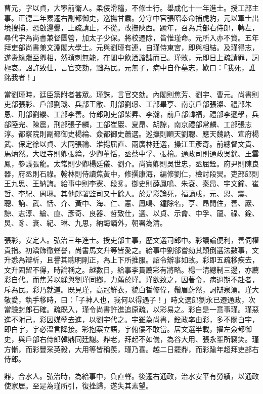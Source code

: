 \begin{pinyinscope}
曹元，字以貞，大寧前衛人。柔佞滑稽，不修士行。舉成化十一年進士。授工部主事。正德二年累遷右副都御史，巡撫甘肅。分守中官張昭奉命捕虎豹，元以軍士出境搜捕，恐啟邊釁，上疏請止，不從。改撫陜西。踰年，召為兵部右侍郎，轉左，尋代宇為尚書兼督團營，加太子少保。將校遷除，皆惟瑾命。元所入亦不貲。五年拜吏部尚書兼文淵閣大學士。元與劉瑾有連，自瑾侍東宮，即與相結。及瑾得志，遂夤緣躐至卿相，然瑣刺無能，在閣中飲酒諧謔而已。瑾敗，元即日上疏請罪，詞極哀。詔許致仕，言官交劾，黜為民。元無子，病中自作墓志，歎曰：「我死，誰銘我者！」

當劉瑾時，廷臣黨附者甚眾。瑾誅，言官交劾。內閣則焦芳、劉宇、曹元。尚書則吏部張彩、戶部劉璣、兵部王敞、刑部劉璟、工部畢亨、南京戶部張澯、禮部朱恩、刑部劉纓、工部李善。侍郎則吏部柴昇、李瀚，前戶部韓福，禮部李遜學，兵部陸完、陳震，刑部張子麟，工部崔巖、夏昂、胡諒，南京禮部常麟、工部張志淳。都察院則副都御史楊綸、僉都御史蕭選。巡撫則順天劉聰、應天魏訥、宣府楊武、保定徐以貞、大同張禴、淮揚屈直、兩廣林廷選，操江王彥奇。前總督文貴、馬炳然。大理寺則卿張綸，少卿董恬，丞蔡中孚、張檜。通政司則通政吳釴、王雲鳳，參議張龍。太常則少卿楊廷儀、劉介。尚寶卿則吳世忠，丞屈銓。府尹則陳良器，府丞則石祿。翰林則侍讀焦黃中，修撰康海，編修劉仁，檢討段炅。吏部郎則王九思、王納誨。給事中則李憲、段豸。御史則薛鳳鳴、朱袞、秦昂、宇文鐘、崔哲、李紀、周琳。其他郎署監司又十餘人。於是彩論死，福謫戍，元、恩、震、聰、訥、武、恬、介、黃中、海、仁、憲、鳳鳴、鐘除名，亨、昂閒住，善、巖、諒、志淳、綸、直、彥奇、良器、哲致仕，選、以貞、示龠、中孚、龍、祿、銓、炅、豸、袞、紀、琳、九思，納誨謫外，朝署為清。

張彩，安定人。弘治三年進士。授吏部主事，歷文選司郎中。彩議論便利，善伺權貴指。初矯飾徹聲譽，尚書馬文升等皆愛之。給事中劉郤嘗劾其顛倒選法數事，文升悉為辯析，且譽其聰明剛正，為上下所推服。詔令辦事如故。彩即五疏移疾去，文升固留不得，時論稱之。越數日，給事李貫薦彩有將略。楊一清總制三邊，亦薦彩自代。而焦芳以綵與劉瑾同鄉，力薦於瑾。瑾欲致之，因著令，病過期不赴者，斥為民。彩乃就道。既見瑾，高冠鮮衣，貌白晳修偉，鬚眉蔚然，詞辯泉湧。瑾大敬愛，執手移時，曰：「子神人也，我何以得遇子！」時文選郎劉永已遷通政，次當驗封郎石確。疏既入，瑾令尚書許進追原疏，以彩易之。彩自是一意事瑾。瑾惡進不附己，彩因媒孽去進，以劉宇代之。宇雖為尚書，銓政率由彩，多不關白宇，即白宇，宇必溫言降接。彩抱案立語，宇俯僂不敢當。居文選半載，擢左僉都御史，與戶部右侍郎韓鼎同廷謝。鼎老，拜起不如儀，為谷大用、張永輩所竊笑。瑾方慚，而彩豐采英毅，大用等皆稱羨，瑾乃喜。越二日罷鼎，而彩踰年超拜吏部右侍郎。

鼎，合水人。弘治時，為給事中，負直聲。後遷右通政，治水安平有勞績，以通政使家居。至是為瑾所引，復挫歸，遂失其素望。


\end{pinyinscope}
